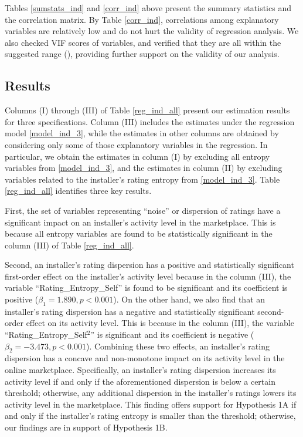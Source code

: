 \documentclass[msom,blindrev]{informs3}
\begin{document}
	
	
	
	
	Tables \ref{sumstats_ind} and \ref{corr_ind} above present the summary statistics and the correlation matrix. By Table \ref{corr_ind}, correlations among explanatory variables are relatively low and do not hurt the validity of regression analysis. We also checked VIF scores of variables, and verified that they are all within the suggested range (\cite{hairmultivariate}), providing further support on the validity of our analysis.
	

	
	\subsection{Results}
	
Columns (I) through (III) of Table \ref{reg_ind_all} present our estimation results for three specifications. Column (III) includes the estimates under the regression model \eqref{model_ind_3}, while the estimates in other columns are obtained by considering only some of those explanatory variables in the regression. In particular, we obtain the estimates in column (I) by excluding all entropy variables from \eqref{model_ind_3}, and the estimates in column (II) by excluding variables related to the installer's rating entropy from \eqref{model_ind_3}. Table \ref{reg_ind_all} identifies three key results.




First, the set of variables representing ``noise'' or dispersion of ratings have a significant impact on an installer's activity level in the marketplace. This is because  all entropy variables are found to be statistically significant in the column (III) of Table \ref{reg_ind_all}.
	
	Second, an installer's rating dispersion has a positive and statistically significant first-order effect on the installer's activity level because in the column (III), the variable ``Rating\_Entropy\_Self'' is found to be significant and its coefficient is positive ($\beta_{1} = 1.890,p<0.001$). On the other hand, we also find that an installer's rating dispersion has a negative and statistically significant second-order effect on its activity level. This is because in the column (III), the variable ``Rating\_Entropy\_Self$^2$'' is significant and its coefficient is negative ($\beta_{2} = -3.473, p<0.001$). Combining these two effects, an installer's rating dispersion has a concave and non-monotone impact on its activity level in the online marketplace. Specifically,  an installer's rating dispersion increases its activity level if and only if the aforementioned dispersion is below a certain threshold; otherwise, any additional dispersion in the installer's ratings lowers its activity level in the marketplace. This finding offers support for Hypothesis 1A if and only if the installer's rating entropy is smaller than the threshold; otherwise, our findings are in support of Hypothesis 1B.
	
\end{document}
